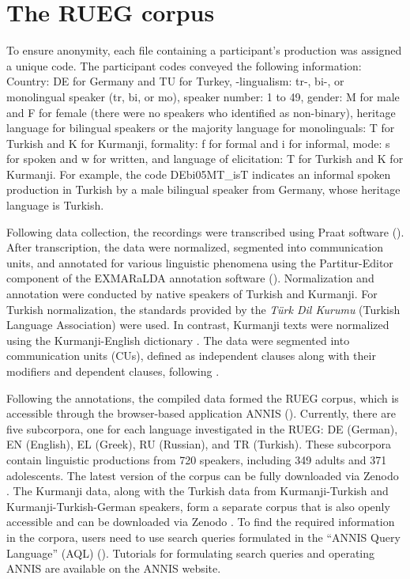 \section{The RUEG corpus}\label{sec:key:4.3}

To ensure anonymity, each file containing a participant’s production was assigned a unique code. The participant codes conveyed the following information: Country: DE for Germany and TU for Turkey, -lingualism: tr-, bi-, or monolingual speaker (tr, bi, or mo), speaker number: 1 to 49, gender: M for male and F for female (there were no speakers who identified as non-binary), heritage language for bilingual speakers or the majority language for monolinguals: T for Turkish and K for Kurmanji, formality: f for formal and i for informal, mode: s for spoken and w for written, and language of elicitation: T for Turkish and K for Kurmanji. For example, the code DEbi05MT\_isT indicates an informal spoken production in Turkish by a male bilingual speaker from Germany, whose heritage language is Turkish.

Following data collection, the recordings were transcribed using Praat software (\citealt{BoersmaWeenink2023}). After transcription, the data were normalized, segmented into communication units, and annotated for various linguistic phenomena using the Partitur-Editor component of the EXMARaLDA annotation software (\citealt{SchmidtWorner2014}). Normalization and annotation were conducted by native speakers of Turkish and Kurmanji. For Turkish normalization, the standards provided by the \textit{Türk Dil Kurumu} (Turkish Language Association) were used. In contrast, Kurmanji texts were normalized using the Kurmanji-English dictionary \citep{Chyet2003}. The data were segmented into communication units (CUs), defined as independent clauses along with their modifiers and dependent clauses, following \citet[9]{Loban1976}.

Following the annotations, the compiled data formed the RUEG corpus, which is accessible through the browser-based application ANNIS (\citealt{KrauseZeldes2016}). Currently, there are five subcorpora, one for each language investigated in the RUEG: DE (German), EN (English), EL (Greek), RU (Russian), and TR (Turkish). These subcorpora contain linguistic productions from 720 speakers, including 349 adults and 371 adolescents. The latest version of the corpus can be fully downloaded via Zenodo \citep{LudelingEtAl2024}. The Kurmanji data, along with the Turkish data from Kurmanji-Turkish and Kurmanji-Turkish-German speakers, form a separate corpus that is also openly accessible and can be downloaded via Zenodo \citep{IefremenkoEtAl2024}. To find the required information in the corpora, users need to use search queries formulated in the “ANNIS Query Language” (AQL) (\citealt{KrauseZeldes2016}). Tutorials for formulating search queries and operating ANNIS are available on the ANNIS website.

